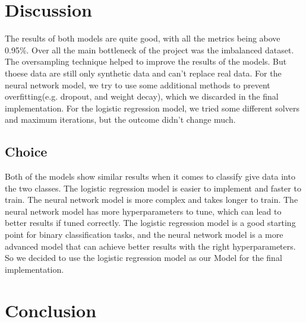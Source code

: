 \documentclass[a4, 10 pt, conference]{ieeeconf}  %
\begin{document}
\section{Discussion}
\label{sec:discuss}



The results of both models are quite good, with all the metrics being above 0.95\%. Over all the main bottleneck of the project was the imbalanced dataset. The oversampling technique helped to improve the results of the models. But thoese data are still only synthetic data and can't replace real data.
For the neural network model, we try to use some additional methods to prevent overfitting(e.g. dropout, and weight decay), which we discarded in the final implementation. For the logistic regression model, we tried some different solvers and maximum iterations, but the outcome didn't change much.

\subsection{Choice}
Both of the models show similar results when it comes to classify give data into the two classes. The logistic regression model is easier to implement and faster to train. The neural network model is more complex and takes longer to train. The neural network model has more hyperparameters to tune, which can lead to better results if tuned correctly.
The logistic regression model is a good starting point for binary classification tasks, and the neural network model is a more advanced model that can achieve better results with the right hyperparameters. So we decided to use the logistic regression model as our Model for the final implementation.

\section{Conclusion}
\label{sec:con}
\end{document}
